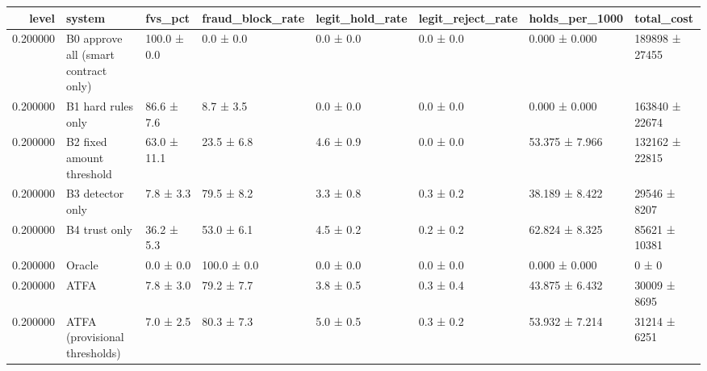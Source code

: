 \begin{tabular}{rlllllll}
\toprule
level & system & fvs\_pct & fraud\_block\_rate & legit\_hold\_rate & legit\_reject\_rate & holds\_per\_1000 & total\_cost \\
\midrule
0.200000 & B0 approve all (smart contract only) & 100.0 ± 0.0 & 0.0 ± 0.0 & 0.0 ± 0.0 & 0.0 ± 0.0 & 0.000 ± 0.000 & 189898 ± 27455 \\
0.200000 & B1 hard rules only & 86.6 ± 7.6 & 8.7 ± 3.5 & 0.0 ± 0.0 & 0.0 ± 0.0 & 0.000 ± 0.000 & 163840 ± 22674 \\
0.200000 & B2 fixed amount threshold & 63.0 ± 11.1 & 23.5 ± 6.8 & 4.6 ± 0.9 & 0.0 ± 0.0 & 53.375 ± 7.966 & 132162 ± 22815 \\
0.200000 & B3 detector only & 7.8 ± 3.3 & 79.5 ± 8.2 & 3.3 ± 0.8 & 0.3 ± 0.2 & 38.189 ± 8.422 & 29546 ± 8207 \\
0.200000 & B4 trust only & 36.2 ± 5.3 & 53.0 ± 6.1 & 4.5 ± 0.2 & 0.2 ± 0.2 & 62.824 ± 8.325 & 85621 ± 10381 \\
0.200000 & Oracle & 0.0 ± 0.0 & 100.0 ± 0.0 & 0.0 ± 0.0 & 0.0 ± 0.0 & 0.000 ± 0.000 & 0 ± 0 \\
0.200000 & ATFA & 7.8 ± 3.0 & 79.2 ± 7.7 & 3.8 ± 0.5 & 0.3 ± 0.4 & 43.875 ± 6.432 & 30009 ± 8695 \\
0.200000 & ATFA (provisional thresholds) & 7.0 ± 2.5 & 80.3 ± 7.3 & 5.0 ± 0.5 & 0.3 ± 0.2 & 53.932 ± 7.214 & 31214 ± 6251 \\
\bottomrule
\end{tabular}
